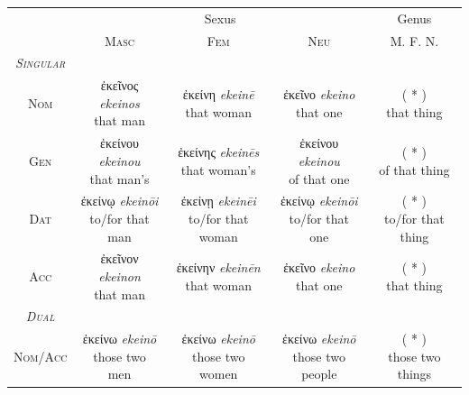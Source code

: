 \documentclass[10pt,a4paper,notitlepage]{article}
\newcommand{\tsc}[1]{\textsc{#1}}
\newcommand*{\grc}[1]{\fontspec{Inter}#1\rmfamily}
\newcommand{\trc}[1]{\textit{\fontspec{Tinos}#1}}
\begin{document}
    \begin{table}[H]
        \begin{tabular}{c|ccc|c}
            & \multicolumn{3}{c|}{Sexus} & Genus \\
            & \tsc{Masc} & \tsc{Fem} & \tsc{Neu} & \tsc{M. F. N.} \\
        \hline
            \emph{\tsc{Singular}} & & & & \\
        \tsc{Nom} & \makecell{\grc{ἐκεῖνος} \trc{ekeinos} \\ \small that man} & \makecell{\grc{ἐκείνη} \trc{ekeinē} \\ \small that woman} & \makecell{\grc{ἐκεῖνο} \trc{ekeino} \\ \small that one} & \makecell{( * ) \\ \small that thing} \\
        \tsc{Gen} & \makecell{\grc{ἐκείνου} \trc{ekeinou} \\ \small that man's} & \makecell{\grc{ἐκείνης} \trc{ekeinēs} \\ \small that woman's} & \makecell{\grc{ἐκείνου} \trc{ekeinou} \\ \small of that one} & \makecell{( * ) \\ \small of that thing} \\
        \tsc{Dat} & \makecell{\grc{ἐκείνῳ} \trc{ekeinōi} \\ \small to/for that man} & \makecell{\grc{ἐκείνῃ} \trc{ekeinēi} \\ \small to/for that woman} & \makecell{\grc{ἐκείνῳ} \trc{ekeinōi} \\ \small to/for that one} & \makecell{( * ) \\ \small to/for that thing} \\
        \tsc{Acc} & \makecell{\grc{ἐκεῖνον} \trc{ekeinon} \\ \small that man} & \makecell{\grc{ἐκείνην} \trc{ekeinēn} \\ \small that woman} & \makecell{\grc{ἐκεῖνο} \trc{ekeino} \\ \small that one} & \makecell{( * ) \\ \small that thing} \\
        \hline
        \emph{\tsc{Dual}} & & & & \\
        \tsc{Nom/Acc} & \makecell{\grc{ἐκείνω} \trc{ekeinō} \\ \small those two men} & \makecell{\grc{ἐκείνω} \trc{ekeinō} \\ \small those two women} & \makecell{\grc{ἐκείνω} \trc{ekeinō} \\ \small those two people} & \makecell{( * ) \\ \small those two things} \\

\end{tabular}
\end{table}
\end{document}

